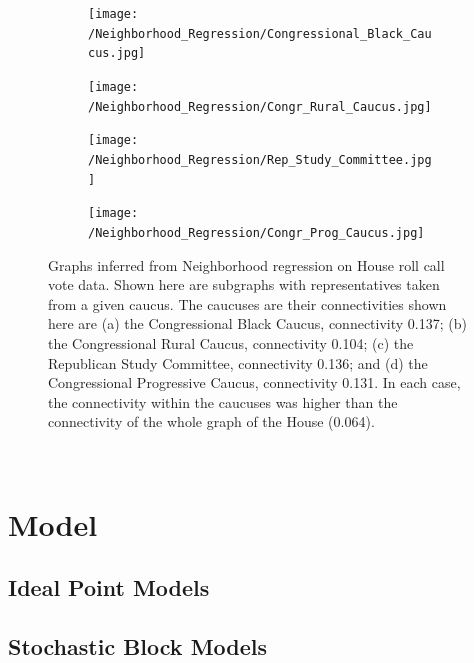\documentclass{article}
\begin{document}
\begin{figure}[h]
  \centering
    \begin{subfigure}[b]{0.49\textwidth}
        \texttt{[image: /Neighborhood\_Regression/Congressional\_Black\_Caucus.jpg]}
        \caption{}
    \end{subfigure}
          \begin{subfigure}[b]{0.49\textwidth}
        \texttt{[image: /Neighborhood\_Regression/Congr\_Rural\_Caucus.jpg]}
        \caption{}
    \end{subfigure}
        \begin{subfigure}[b]{0.49\textwidth}
        \texttt{[image: /Neighborhood\_Regression/Rep\_Study\_Committee.jpg]}
        \caption{}
    \end{subfigure}
          \begin{subfigure}[b]{0.49\textwidth}
        \texttt{[image: /Neighborhood\_Regression/Congr\_Prog\_Caucus.jpg]}
        \caption{}
    \end{subfigure}
  \caption{Graphs inferred from Neighborhood regression on House roll call vote data. Shown here are subgraphs with representatives taken from a given caucus. The caucuses are their connectivities shown here are (a) the Congressional Black Caucus, connectivity 0.137; (b) the Congressional Rural Caucus, connectivity 0.104; (c) the Republican Study Committee, connectivity 0.136; and (d) the Congressional Progressive Caucus, connectivity 0.131. In each case, the connectivity within the caucuses was higher than the connectivity of the whole graph of the House (0.064).}
      \label{fig:Nhood_Caucus}
\end{figure}


\newpage
~
\newpage

\section{Model}
\label{model}

\subsection{Ideal Point Models}

\subsection{Stochastic Block Models}
\end{document}
